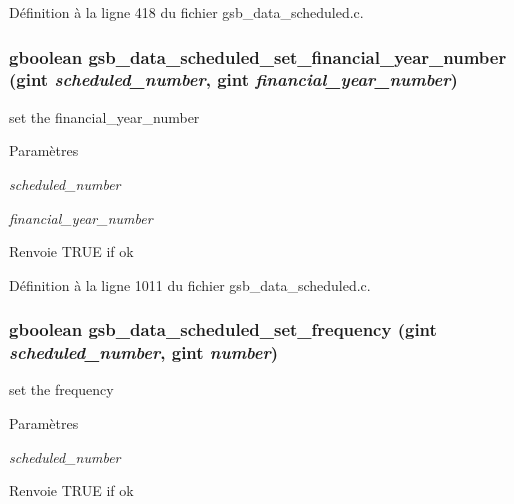 Définition à la ligne 418 du fichier gsb\_\-data\_\-scheduled.c.

\subsubsection[{gsb\_\-data\_\-scheduled\_\-set\_\-financial\_\-year\_\-number}]{\setlength{\rightskip}{0pt plus 5cm}gboolean gsb\_\-data\_\-scheduled\_\-set\_\-financial\_\-year\_\-number (gint {\em scheduled\_\-number}, \/  gint {\em financial\_\-year\_\-number})}\label{gsb__data__scheduled_8c_ac692709b96f3876b8df8a081021e1bab}
set the financial\_\-year\_\-number


\begin{DoxyParams}{Paramètres}
\item[{\em scheduled\_\-number}]\item[{\em financial\_\-year\_\-number}]\end{DoxyParams}
\begin{DoxyReturn}{Renvoie}
TRUE if ok 
\end{DoxyReturn}


Définition à la ligne 1011 du fichier gsb\_\-data\_\-scheduled.c.

\subsubsection[{gsb\_\-data\_\-scheduled\_\-set\_\-frequency}]{\setlength{\rightskip}{0pt plus 5cm}gboolean gsb\_\-data\_\-scheduled\_\-set\_\-frequency (gint {\em scheduled\_\-number}, \/  gint {\em number})}\label{gsb__data__scheduled_8c_a3752ff74a4faa566975281e33ae6318b}
set the frequency


\begin{DoxyParams}{Paramètres}
\item[{\em scheduled\_\-number}]\item[{\em }]\end{DoxyParams}
\begin{DoxyReturn}{Renvoie}
TRUE if ok 
\end{DoxyReturn}


